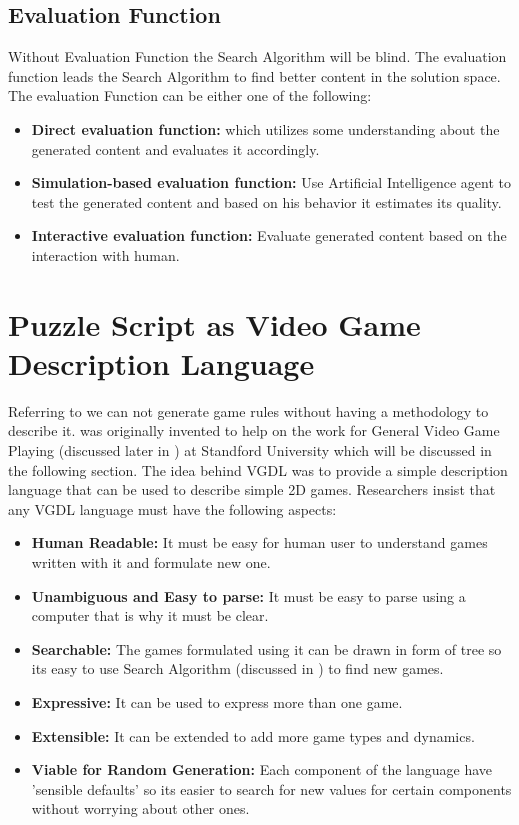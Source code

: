 \subsection{Evaluation Function}
Without Evaluation Function the Search Algorithm will be blind. The evaluation function leads the Search Algorithm to find better content in the solution space. The evaluation Function can be either one of the following:\cite{pcgBookSearch}
\begin{itemize}\itemsep0pt \parskip0pt 
	\item \textbf{Direct evaluation function:} which utilizes some understanding about the generated content and evaluates it accordingly.
	\item \textbf{Simulation-based evaluation function:} Use Artificial Intelligence agent to test the generated content and based on his behavior it estimates its quality.
	\item \textbf{Interactive evaluation function:} Evaluate generated content based on the interaction with human.
\end{itemize}

\section{Puzzle Script as Video Game Description Language}
Referring to  we can not generate game rules without having a methodology to describe it.  was originally invented to help on the work for General Video Game Playing (discussed later in ) at Standford University which will be discussed in the following section. The idea behind VGDL was to provide a simple description language that can be used to describe simple 2D games. Researchers insist that any VGDL language must have the following aspects:\cite{vgdl}
\begin{itemize}\itemsep0pt \parskip0pt 
	\item \textbf{Human Readable:} It must be easy for human user to understand games written with it and formulate new one.
	\item \textbf{Unambiguous and Easy to parse:} It must be easy to parse using a computer that is why it must be clear.
	\item \textbf{Searchable:} The games formulated using it can be drawn in form of tree so its easy to use Search Algorithm (discussed in ) to find new games.
	\item \textbf{Expressive:} It can be used to express more than one game.
	\item \textbf{Extensible:} It can be extended to add more game types and dynamics.
	\item \textbf{Viable for Random Generation:} Each component of the language have 'sensible defaults' so its easier to search for new values for certain components without worrying about other ones.
\end{itemize}

